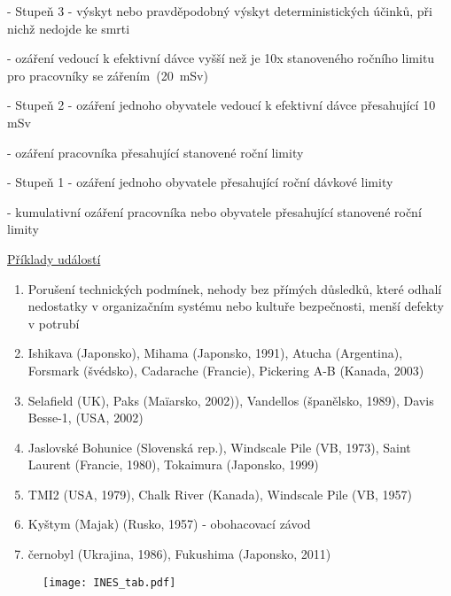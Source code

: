 \noindent - 	Stupeň 3 - výskyt nebo pravděpodobný výskyt deterministických účinků, při nichž nedojde ke smrti

-	ozáření vedoucí k efektivní dávce vyšší než je 10x stanoveného ročního limitu pro pracovníky se zářením~\mbox{(20 mSv)}

\noindent - 	Stupeň 2 - ozáření jednoho obyvatele vedoucí k efektivní dávce přesahující 10 mSv

-	ozáření pracovníka přesahující stanovené roční limity

\noindent - 	Stupeň 1 - ozáření jednoho obyvatele přesahující roční dávkové limity

-	kumulativní ozáření pracovníka nebo obyvatele přesahující stanovené roční limity


\underline{Příklady událostí}
\begin{enumerate}\setlength{\itemsep}{0.05ex}
	\item Porušení technických podmínek, nehody bez přímých důsledků, které odhalí nedostatky v organizačním systému nebo kultuře bezpečnosti, menší defekty v potrubí
	\item Ishikava (Japonsko), Mihama (Japonsko, 1991), Atucha (Argentina), Forsmark (švédsko), Cadarache (Francie), Pickering A-B (Kanada, 2003)
	\item Selafield (UK), Paks (Maïarsko, 2002)), Vandellos (španělsko, 1989), Davis Besse-1, (USA, 2002)
	\item Jaslovské Bohunice (Slovenská rep.), Windscale Pile (VB, 1973), Saint Laurent (Francie, 1980), Tokaimura (Japonsko, 1999)
	\item TMI2 (USA, 1979), Chalk River (Kanada), Windscale Pile (VB, 1957)
	\item Kyštym (Majak) (Rusko, 1957) - obohacovací závod
	\item černobyl (Ukrajina, 1986), Fukushima (Japonsko, 2011)
\end{enumerate}

\vspace{-3ex}
\begin{figure}[h!]
    \centering
    \texttt{[image: INES\_tab.pdf]}
\end{figure}
\clearpage




















